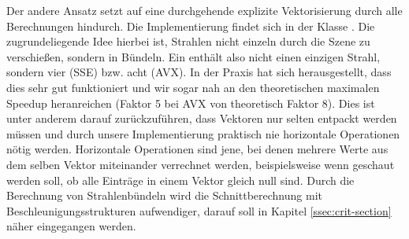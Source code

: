 Der andere Ansatz setzt auf eine durchgehende explizite Vektorisierung durch alle Berechnungen hindurch.
Die Implementierung findet sich in der Klasse .
Die zugrundeliegende Idee hierbei ist, Strahlen nicht einzeln durch die Szene zu verschießen, sondern in Bündeln.
Ein  enthält also nicht einen einzigen Strahl, sondern vier (SSE) bzw. acht (AVX).
In der Praxis hat sich herausgestellt, dass dies sehr gut funktioniert und wir sogar nah an den theoretischen maximalen Speedup heranreichen (Faktor 5 bei AVX von theoretisch Faktor 8).
Dies ist unter anderem darauf zurückzuführen, dass Vektoren nur selten entpackt werden müssen und durch unsere Implementierung praktisch nie horizontale Operationen nötig werden.
Horizontale Operationen sind jene, bei denen mehrere Werte aus dem selben Vektor miteinander verrechnet werden, beispielsweise wenn geschaut werden soll, ob alle Einträge in einem Vektor gleich null sind.
Durch die Berechnung von Strahlenbündeln wird die Schnittberechnung mit Beschleunigungsstrukturen aufwendiger, darauf soll in Kapitel \ref{ssec:crit-section} näher eingegangen werden.
